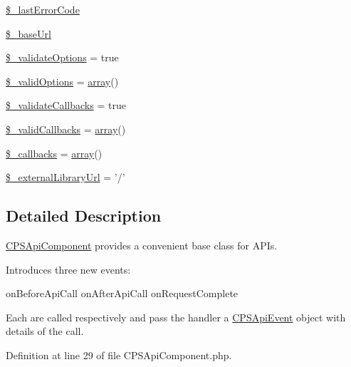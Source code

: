 \begin{DoxyCompactItemize}
\item 
\hyperlink{classCPSApiComponent_a9d205559114adfd52ac69bbb094a8a1a}{\$\_\-lastErrorCode}
\item 
\hyperlink{classCPSApiComponent_ae5c686cdf8e6a089b6296dcb659f6d01}{\$\_\-baseUrl}
\item 
\hyperlink{classCPSApiComponent_a06b741ce121a93d6010e3c514edba22b}{\$\_\-validateOptions} = true
\item 
\hyperlink{classCPSApiComponent_afe1adfd2c4c57954ea5230cae01d1c47}{\$\_\-validOptions} = \hyperlink{list_8php_aa3205d038c7f8feb5c9f01ac4dfadc88}{array}()
\item 
\hyperlink{classCPSApiComponent_a73fdad41769f4f4ef1ebeaba5380ffad}{\$\_\-validateCallbacks} = true
\item 
\hyperlink{classCPSApiComponent_aadd5e6fdc7ba1ec3b3e4a916c4f005d0}{\$\_\-validCallbacks} = \hyperlink{list_8php_aa3205d038c7f8feb5c9f01ac4dfadc88}{array}()
\item 
\hyperlink{classCPSApiComponent_ae1d5e7a4a34ac8fa4dbdef28983a1fcc}{\$\_\-callbacks} = \hyperlink{list_8php_aa3205d038c7f8feb5c9f01ac4dfadc88}{array}()
\item 
\hyperlink{classCPSApiComponent_aae8a45534cedd7fc0881ca1995d8bb9c}{\$\_\-externalLibraryUrl} = '/'
\end{DoxyCompactItemize}


\subsection{Detailed Description}
\hyperlink{classCPSApiComponent}{CPSApiComponent} provides a convenient base class for APIs.

Introduces three new events:

onBeforeApiCall onAfterApiCall onRequestComplete

Each are called respectively and pass the handler a \hyperlink{classCPSApiEvent}{CPSApiEvent} object with details of the call. 

Definition at line 29 of file CPSApiComponent.php.



